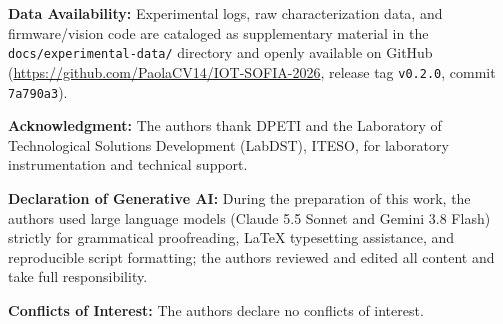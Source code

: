 \documentclass[lettersize,journal]{IEEEtran}
\begin{document}
	\textbf{Data Availability:} Experimental logs, raw characterization data, and firmware/vision code are cataloged as supplementary material in the \texttt{docs/experimental-data/} directory and openly available on GitHub (\url{https://github.com/PaolaCV14/IOT-SOFIA-2026}, release tag \texttt{v0.2.0}, commit \texttt{7a790a3}).
	
	\textbf{Acknowledgment:} The authors thank DPETI and the Laboratory of Technological Solutions Development (LabDST), ITESO, for laboratory instrumentation and technical support.
	
	\textbf{Declaration of Generative AI:} During the preparation of this work, the authors used large language models (Claude 5.5 Sonnet and Gemini 3.8 Flash) strictly for grammatical proofreading, LaTeX typesetting assistance, and reproducible script formatting; the authors reviewed and edited all content and take full responsibility.
	
	\textbf{Conflicts of Interest:} The authors declare no conflicts of interest.
	\normalsize
	
	\balance
	
	
	
\end{document}
